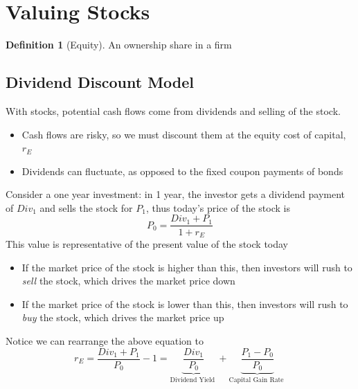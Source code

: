 \documentclass[11pt]{article}
\theoremstyle{definition}
\newtheorem*{definition}{Definition}
\begin{document}
\section{Valuing Stocks}
\begin{definition}[Equity]
    An ownership share in a firm
\end{definition}

\subsection{Dividend Discount Model}
With stocks, potential cash flows come from dividends and selling of the stock. 
\begin{itemize}
    \item Cash flows are risky, so we must discount them at the equity cost of capital, $r_E$
    \item Dividends can fluctuate, as opposed to the fixed coupon payments of bonds
\end{itemize}
Consider a one year investment: in 1 year, the investor gets a dividend payment of $Div_1$ and sells the stock for $P_1$, thus today's price of the stock is
\begin{equation*}
    P_0 = \frac{Div_1 + P_1}{1 + r_E}
\end{equation*}
This value is representative of the present value of the stock today
\begin{itemize}
    \item If the market price of the stock is higher than this, then investors will rush to \textit{sell} the stock, which drives the market price down
    \item If the market price of the stock is lower than this, then investors will rush to \textit{buy} the stock, which drives the market price up
\end{itemize}
Notice we can rearrange the above equation to 
\begin{equation*}
    r_E = \frac{Div_1 + P_1}{P_0} - 1 = \underbrace{\frac{D i v_1}{P_0}}_{\text {Dividend Yield }}+\underbrace{\frac{P_1-P_0}{P_0}}_{\text {Capital Gain Rate }}
\end{equation*}
\end{document}
